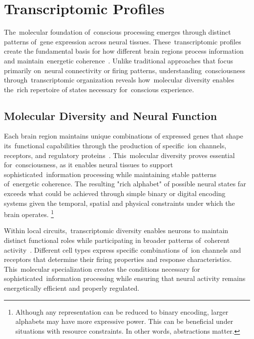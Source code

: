 \section{Transcriptomic Profiles~}

The~molecular foundation of~conscious processing emerges through distinct patterns of~gene expression across neural tissues. These~transcriptomic profiles create the fundamental basis for how different brain regions process information and maintain~energetic coherence~\cite{Tasic2018, Hawrylycz2012}. Unlike traditional approaches that focus primarily on~neural connectivity or firing patterns, understanding~consciousness through~transcriptomic organization reveals how~molecular diversity enables the~rich repertoire of states necessary for~conscious experience.

\subsection*{Molecular Diversity and Neural Function~}

Each brain region maintains unique combinations of expressed genes that shape its~functional capabilities through the production of specific~ion channels, receptors, and regulatory proteins~\cite{Bakken2021, Lake2018}. This~molecular diversity proves essential for~consciousness, as it enables neural tissues to support sophisticated~information processing while maintaining stable patterns of~energetic coherence. The resulting "rich alphabet" of possible neural states far exceeds what could be achieved through simple binary or digital encoding systems given the temporal, spatial and physical constraints under which the brain operates. \footnote{Although any representation can be reduced to binary encoding, larger alphabets may have more expressive power. This can be beneficial under situations with resource constraints. In other words, abstractions matter.}

Within local circuits,~transcriptomic diversity enables neurons to maintain distinct functional roles while participating in broader patterns of~coherent activity~\cite{Lake2016, Tasic2018}. Different cell types express specific combinations of~ion channels and receptors that determine their firing properties and response characteristics. This~molecular specialization creates the conditions necessary for sophisticated~information processing while ensuring that neural activity remains energetically efficient and properly regulated.

